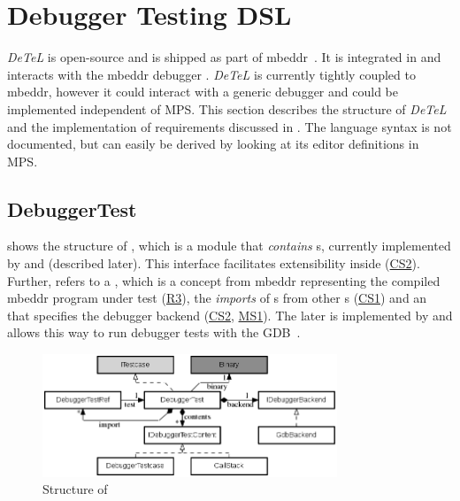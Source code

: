 \section{Debugger Testing DSL}

\emph{DeTeL} is open-source and is shipped as part of
mbeddr~\cite{mbeddrGithub}.
It is integrated in  and interacts
with the mbeddr debugger . \emph{DeTeL} is currently tightly
coupled to mbeddr, however it could interact with a generic debugger 
and could be implemented independent of \ac{MPS}.
This section describes the structure of \emph{DeTeL} and the
implementation of requirements discussed in . 
The language syntax is not documented, but can easily be derived by
looking at its editor definitions in \ac{MPS}. 

\subsection{DebuggerTest}
\label{DebuggerTestSection}

 shows the structure of 
, which is a module that \emph{contains} 
s, currently implemented by 
 and  (described later). This interface
facilitates extensibility inside
 (\hyperref[CS2]{CS2}). Further,  refers to 
a , which is a concept from mbeddr representing the compiled mbeddr
program under test (\hyperref[R3]{R3}), 
the \emph{imports} of s from
other s (\hyperref[CS1]{CS1}) and an
 that specifies the debugger backend 
(\hyperref[CS2]{CS2}, \hyperref[MS1]{MS1}). The later is implemented by
 and allows this way to run debugger tests with the
\ac{GDB}~\cite{gdb}.

\vspace{1mm}
\begin{figure}[h]
  \vspace{-2mm}
  \centering
    \includegraphics[width=8.8cm]{./figures/graph2-2.png} 
    \vspace{-3mm}
    \caption{Structure of }
  \label{fig:DebuggerTestStructure}
  \vspace{-2mm}
\end{figure}

